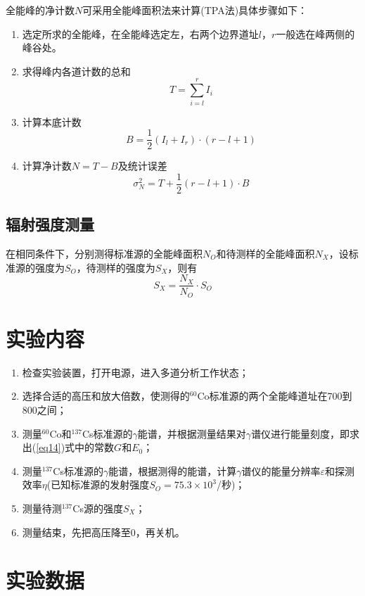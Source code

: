 \documentclass[a4paper]{article}
\begin{document}
全能峰的净计数$N$可采用全能峰面积法来计算(TPA法)具体步骤如下：
\begin{enumerate}
\item 选定所求的全能峰，在全能峰选定左，右两个边界道址$l$，$r$一般选在峰两侧的峰谷处。
\item 求得峰内各道计数的总和
\begin{equation*}
T = \sum\limits_{i=l}^rI_i
\end{equation*}
\item 计算本底计数
\begin{equation*}
B = \frac12(I_l+I_r)\cdot(r-l+1)
\end{equation*}
\item 计算净计数$N=T-B$及统计误差
\begin{equation*}
\sigma_N^2 = T + \frac12(r-l+1)\cdot B
\end{equation*}
\end{enumerate}

\subsection{辐射强度测量}
在相同条件下，分别测得标准源的全能峰面积$N_O$和待测样的全能峰面积$N_X$，设标准源的强度为$S_O$，待测样的强度为$S_X$，则有
\begin{equation}
S_X = \frac{N_X}{N_O}\cdot S_O\label{eq17}
\end{equation}

\section{实验内容}
\begin{enumerate}
\item 检查实验装置，打开电源，进入多道分析工作状态；
\item 选择合适的高压和放大倍数，使测得的$^{60}$Co标准源的两个全能峰道址在700到800之间；
\item 测量$^{60}$Co和$^{137}$Cs标准源的$\gamma$能谱，并根据测量结果对$\gamma$谱仪进行能量刻度，即求出(\ref{eq14})式中的常数$G$和$E_0$；
\item 测量$^{137}$Cs标准源的$\gamma$能谱，根据测得的能谱，计算$\gamma$谱仪的能量分辨率$\varepsilon$和探测效率$\eta$(已知标准源的发射强度$S_O = 75.3\times 10^3$/秒)；
\item 测量待测$^{137}$Cs源的强度$S_X$；
\item 测量结束，先把高压降至0，再关机。
\end{enumerate}

\section{实验数据}
\end{document}
